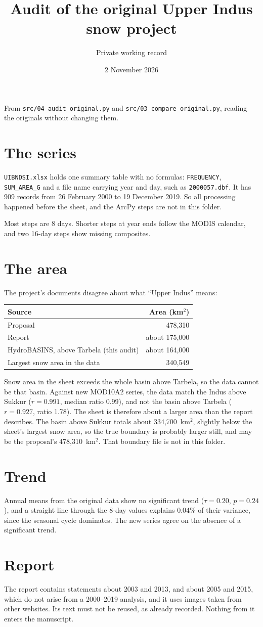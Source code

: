\documentclass[11pt,a4paper]{article}
\title{Audit of the original Upper Indus snow project}
\author{Private working record}
\date{2 November 2026}
\begin{document}
\maketitle
From \texttt{src/04\_audit\_original.py} and \texttt{src/03\_compare\_original.py}, reading the originals without changing them.

\section{The series}
\texttt{UIBNDSI.xlsx} holds one summary table with no formulas: \texttt{FREQUENCY}, \texttt{SUM\_AREA\_G} and a file name carrying year and day, such as \texttt{2000057.dbf}. It has 909 records from 26 February 2000 to 19 December 2019. So all processing happened before the sheet, and the ArcPy steps are not in this folder.

Most steps are 8 days. Shorter steps at year ends follow the MODIS calendar, and two 16-day steps show missing composites.

\section{The area}
The project's documents disagree about what ``Upper Indus'' means:

\begin{tabular}{lr}
\toprule
Source & Area (km$^2$) \\
\midrule
Proposal & 478,310 \\
Report & about 175,000 \\
HydroBASINS, above Tarbela (this audit) & about 164,000 \\
Largest snow area in the data & 340,549 \\
\bottomrule
\end{tabular}

Snow area in the sheet exceeds the whole basin above Tarbela, so the data cannot be that basin. Against new MOD10A2 series, the data match the Indus above Sukkur ($r=0.991$, median ratio 0.99), and not the basin above Tarbela ($r=0.927$, ratio 1.78). The sheet is therefore about a larger area than the report describes. The basin above Sukkur totals about 334,700~km$^2$, slightly below the sheet's largest snow area, so the true boundary is probably larger still, and may be the proposal's 478,310~km$^2$. That boundary file is not in this folder.

\section{Trend}
Annual means from the original data show no significant trend ($\tau=0.20$, $p=0.24$), and a straight line through the 8-day values explains 0.04\% of their variance, since the seasonal cycle dominates. The new series agree on the absence of a significant trend.

\section{Report}
The report contains statements about 2003 and 2013, and about 2005 and 2015, which do not arise from a 2000--2019 analysis, and it uses images taken from other websites. Its text must not be reused, as already recorded. Nothing from it enters the manuscript.
\end{document}
